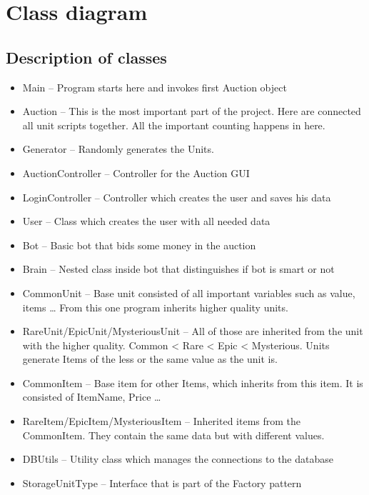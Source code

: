 \documentclass[
]{report}
\providecommand{\tightlist}{%
  \setlength{\itemsep}{0pt}\setlength{\parskip}{0pt}}
\begin{document}
\hypertarget{class-diagram}{%
\section{Class diagram}\label{class-diagram}}

\hypertarget{description-of-classes}{%
\subsection{Description of classes}\label{description-of-classes}}

\begin{itemize}
\tightlist
\item
  Main -- Program starts here and invokes first Auction object
\item
  Auction -- This is the most important part of the project. Here are connected all unit scripts together. All the important counting happens in here.
\item
  Generator -- Randomly generates the Units.
\item
  AuctionController -- Controller for the Auction GUI
\item
  LoginController -- Controller which creates the user and saves his data
\item
  User -- Class which creates the user with all needed data
\item
  Bot -- Basic bot that bids some money in the auction
\item
  Brain -- Nested class inside bot that distinguishes if bot is smart or not
\item
  CommonUnit -- Base unit consisted of all important variables such as value, items \ldots{} From this one program inherits higher quality units.
\item
  RareUnit/EpicUnit/MysteriousUnit -- All of those are inherited from the unit with the higher quality. Common \textless{} Rare \textless{} Epic \textless{} Mysterious. Units generate Items of the less or the same value as the unit is.
\item
  CommonItem -- Base item for other Items, which inherits from this item. It is consisted of ItemName, Price \ldots{}
\item
  RareItem/EpicItem/MysteriousItem -- Inherited items from the CommonItem. They contain the same data but with different values.
\item
  DBUtils -- Utility class which manages the connections to the database
\item
  StorageUnitType -- Interface that is part of the Factory pattern

\end{itemize}
\end{document}
